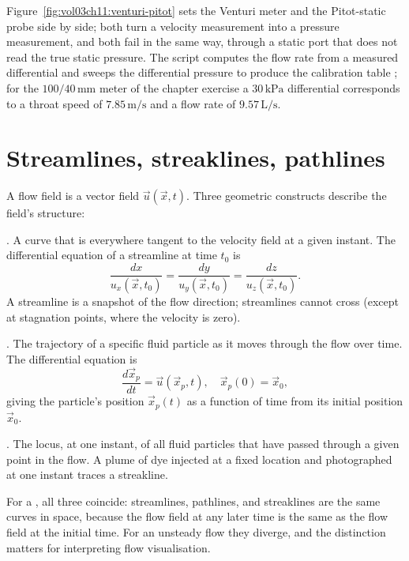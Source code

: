 

Figure~\ref{fig:vol03ch11:venturi-pitot} sets the Venturi meter and
the Pitot-static probe side by side; both turn a velocity measurement
into a pressure measurement, and both fail in the same way, through a
static port that does not read the true static pressure. The script
 computes the flow rate from a measured
differential and sweeps the differential pressure to produce the
calibration table ; for the
$100/40\,\si{\milli\meter}$ meter of the chapter exercise a
$30\,\text{kPa}$ differential corresponds to a throat speed of
$7.85\,\si{\meter\per\second}$ and a flow rate of $9.57\,\text{L/s}$.

\section{Streamlines, streaklines, pathlines}

A flow field is a vector field $\vec{u}(\vec{x}, t)$. Three
geometric constructs describe the field's structure:

. A curve that is everywhere tangent to the
velocity field at a given instant. The differential equation of a
streamline at time $t_0$ is
\[
\frac{dx}{u_x(\vec{x}, t_0)} = \frac{dy}{u_y(\vec{x}, t_0)} =
\frac{dz}{u_z(\vec{x}, t_0)}.
\]
A streamline is a snapshot of the flow direction; streamlines
cannot cross (except at stagnation points, where the velocity is
zero).

. The trajectory of a specific fluid particle as
it moves through the flow over time. The differential equation is
\[
\frac{d\vec{x}_p}{dt} = \vec{u}(\vec{x}_p, t), \quad \vec{x}_p(0) =
\vec{x}_0,
\]
giving the particle's position $\vec{x}_p(t)$ as a function of time
from its initial position $\vec{x}_0$.

. The locus, at one instant, of all fluid
particles that have passed through a given point in the flow. A
plume of dye injected at a fixed location and photographed at one
instant traces a streakline.

For a , all three coincide: streamlines,
pathlines, and streaklines are the same curves in space, because
the flow field at any later time is the same as the flow field
at the initial time. For an unsteady flow they diverge, and the
distinction matters for interpreting flow visualisation.

